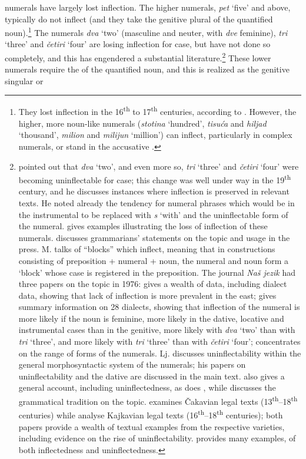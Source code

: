 \documentclass[output=paper,colorlinks,citecolor=brown]{langscibook}
\begin{document}
 numerals have largely lost inflection. The higher numerals, \textit{pet} `five' and above, typically do not inflect (and they take the genitive plural of the quantified noun).\footnote{They lost inflection in the 16\textsuperscript{th} to 17\textsuperscript{th} centuries, according to \citet[138]{rogic1954}. However, the higher, more noun-like numerals (\textit{stotina} `hundred', \textit{tisuća} and \textit{hiljad} `thousand', \textit{milion} and \textit{milijun} `million') can inflect, particularly in complex numerals, or stand in the accusative \citep[11--12]{popovic1979}.} The numerals \textit{dva} `two' (masculine and neuter, with \textit{dve} feminine), \textit{tri} `three' and \textit{četiri} `four' are losing inflection for case, but have not done so completely, and this has engendered a substantial literature.\footnote{\citet{markovic1951} pointed out that \textit{dva} `two', and even more so, \textit{tri} `three' and \textit{četiri} `four' were becoming uninflectable for case; this change was well under way in the 19\textsuperscript{th} century, and he discusses instances where inflection is preserved in relevant texts. He noted already the tendency for numeral phrases which would be in the instrumental to be replaced with \textit{s} `with' and the uninflectable form of the numeral. \citet{rogic1954} gives examples illustrating the loss of inflection of these numerals. \citet{hamm1956} discusses grammarians' statements on the topic and usage in the press. M. \citet{popovic1967} talks of ``blocks'' which inflect, meaning that in constructions consisting of preposition + numeral + noun, the numeral and noun form a `block' whose case is registered in the preposition. The journal \textit{Naš jezik} had three papers on the topic in 1976: \citet{kraljevic1976} gives a wealth of data, including dialect data, showing that lack of inflection is more prevalent in the east; \citet{nikolic1976} gives summary information on 28 dialects, showing that inflection of the numeral is more likely if the noun is feminine, more likely in the dative, locative and instrumental cases than in the genitive, more likely with \textit{dva} `two' than with \textit{tri} `three', and more likely with \textit{tri} `three' than with \textit{četiri} `four'; \citet{radovictesic1976} concentrates on the range of forms of the numerals. Lj. \citet{popovic1979} discusses uninflectability within the general morphosyntactic system of the numerals; his papers on uninflectability and the dative are discussed in the main text. \citet{durovic1985} also gives a general account, including uninflectedness, as does \citet{browne2022}, while \citet{grubisic1994} discusses the grammatical tradition on the topic. \citet{kuzmic2007} examines Čakavian legal texts (13\textsuperscript{th}--18\textsuperscript{th} centuries) while \citet{kuzmickuzmic2007} analyse Kajkavian legal texts (16\textsuperscript{th}--18\textsuperscript{th} centuries); both papers provide a wealth of textual examples from the respective varieties, including evidence on the rise of uninflectability. \citet[148--193]{stefanovic2019} provides many examples, of both inflectedness and uninflectedness.} These lower numerals require the \textit{} of the quantified noun, and this is realized as the genitive singular or 
\end{document}
